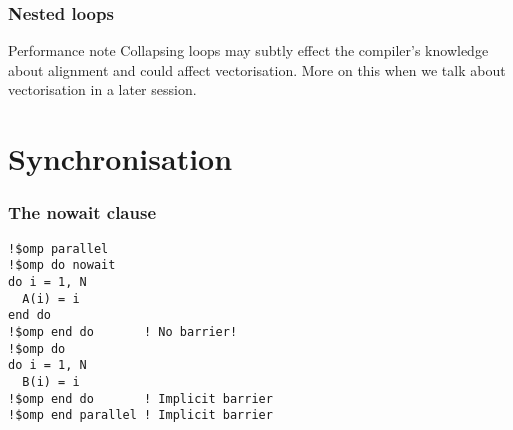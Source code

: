 \documentclass{beamer}
\begin{document}
\begin{frame}
\frametitle{Nested loops}
\begin{block}{Performance note}
Collapsing loops may subtly effect the compiler's knowledge about alignment and could affect vectorisation.
More on this when we talk about vectorisation in a later session.
\end{block}

\end{frame}

\section{Synchronisation}
\begin{frame}[fragile]
\frametitle{The nowait clause}

\begin{verbatim}
!$omp parallel
!$omp do nowait
do i = 1, N
  A(i) = i
end do
!$omp end do       ! No barrier!
!$omp do
do i = 1, N
  B(i) = i
!$omp end do       ! Implicit barrier
!$omp end parallel ! Implicit barrier
\end{verbatim}
\end{frame}
\end{document}
